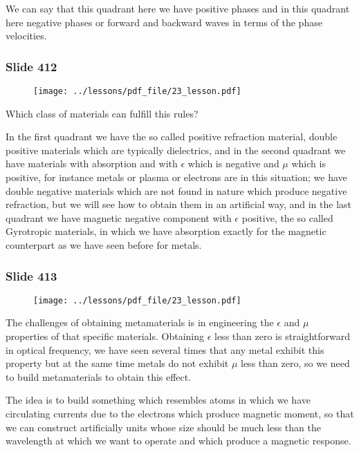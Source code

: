 \documentclass[../main/main.tex]{subfiles}
\begin{document}
We can say that this quadrant here we have positive phases and in this quadrant here negative phases or forward and backward waves in terms of the phase velocities. 

\newpage

\subsubsection{Slide 412}

\begin{figure}[h!]
\centering
\texttt{[image: ../lessons/pdf\_file/23\_lesson.pdf]}
\end{figure}

Which class of materials can fulfill this rules? 

In the first quadrant we have the so called positive refraction material, double positive materials which are typically dielectrics, and in the second quadrant we have materials with absorption and with $\epsilon$ which is negative and $\mu$ which is positive, for instance metals or plasma or electrons are in this situation; we have double negative materials which are not found in nature which produce negative refraction, but we will see how to obtain them in an artificial way, and in the last quadrant we have magnetic negative component with $\epsilon$ positive, the so called Gyrotropic materials, in which we have absorption exactly for the magnetic counterpart as we have seen before for metals.

\newpage

\subsubsection{Slide 413}

\begin{figure}[h!]
\centering
\texttt{[image: ../lessons/pdf\_file/23\_lesson.pdf]}
\end{figure}

The challenges of obtaining metamaterials is in engineering the $\epsilon$ and $\mu$ properties of that specific materials. Obtaining $\epsilon$ less than zero is straightforward in optical frequency, we have seen several times that any metal exhibit this property but at the same time metals do not exhibit $\mu$ less than zero, so we need to build metamaterials to obtain this effect. 

The idea is to build something which resembles atoms in which we have circulating currents due to the electrons which produce magnetic moment, so that we can construct artificially units whose size should be much less than the wavelength at which we want to operate and which produce a magnetic response.
\end{document}
